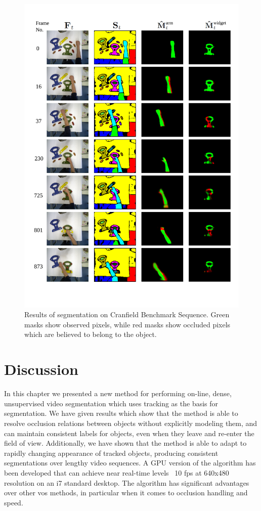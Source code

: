 \begin{figure}[!t]
\includegraphics[width=\linewidth]{figures/ECCV2012/Cranfield_Results.pdf}
  \caption[Results of Cranfield Sequence]{Results of segmentation on Cranfield Benchmark Sequence. Green masks show observed pixels, while red masks show occluded pixels which are believed to belong to the object.}
\label{fig:Cranfield_Results}
\end{figure}

\section{Discussion}
In this chapter we presented a new method for performing on-line, dense, unsupervised video segmentation which uses tracking as the basis for segmentation. We have given results which show that the method is able to resolve occlusion relations between objects without explicitly modeling them, and can maintain consistent labels for objects, even when they leave and re-enter the field of view. Additionally, we have shown that the method is able to adapt to rapidly changing appearance of tracked objects, producing consistent segmentations over lengthy video sequences. A GPU version of the algorithm has been developed that can achieve near real-time levels ~10 fps at 640x480 resolution on an i7 standard desktop. The algorithm has significant advantages over other \gls{vos} methods, in particular when it comes to occlusion handling and speed.

